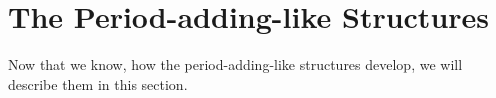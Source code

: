 \section{The Period-adding-like Structures}
\label{sec:add.add}

Now that we know, how the period-adding-like structures develop, we will describe them in this section.





